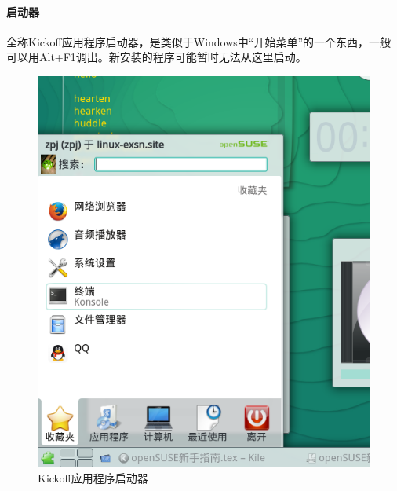 \documentclass[11pt,openany]{book}
\begin{document}
\paragraph{启动器} 全称Kickoff应用程序启动器，是类似于Windows中“开始菜单”的一个东西，一般可以用Alt+F1调出。新安装的程序可能暂时无法从这里启动。
\begin{figure}[htbp]
\centering
\includegraphics{./pic/kickoff.png} 
\caption{Kickoff应用程序启动器}
\end{figure}
\end{document}
